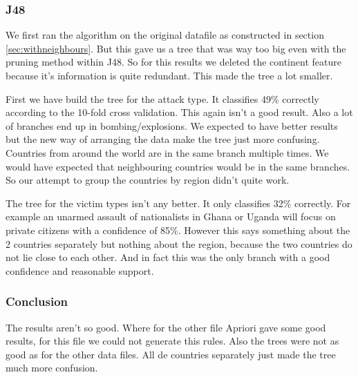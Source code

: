 \documentclass[a4]{article}
\begin{document}
\subsubsection{J48}
We first ran the algorithm on the original datafile as constructed in section \ref{sec:withneighbours}. But this gave us a tree that was way too big even with the pruning method within J48. So for this results we deleted the continent feature because it's information is quite redundant. This made the tree a lot smaller.\par
First we have build the tree for the attack type. It classifies 49\% correctly according to the 10-fold cross validation. This again isn't a good result. Also a lot of branches end up in bombing/explosions. We expected to have better results but the new way of arranging the data make the tree just more confusing. Countries from around the world are in the same branch multiple times. We would have expected that neighbouring countries would be in the same branches. So our attempt to group the countries by region didn't quite work.\par
The tree for the victim types isn't any better. It only classifies 32\% correctly. For example an unarmed assault of nationalists in Ghana or Uganda will focus on private citizens with a confidence of 85\%. However this says something about the 2 countries separately but nothing about the region, because the two countries do not lie close to each other. And in fact this was the only branch with a good confidence and reasonable support.
\subsubsection{Conclusion}
The results aren't so good. Where for the other file Apriori gave some good results, for this file we could not generate this rules. Also the trees were not as good as for the other data files. All de countries separately just made the tree much more confusion.
\end{document}
